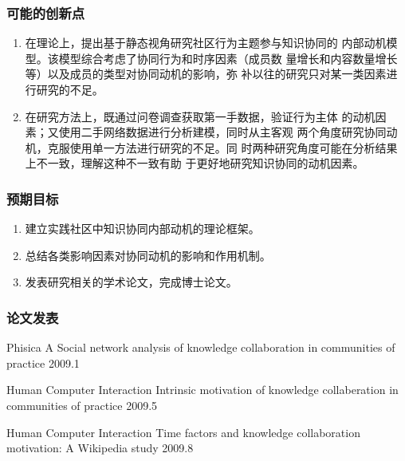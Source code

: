 \documentclass[slidestop,compress,mathserif,blue,compress]{beamer}
\begin{document}
\begin{frame}
  \frametitle{可能的创新点}
 \begin{enumerate}
\vfill
\item 在理论上，提出基于静态视角研究社区行为主题参与知识协同的
            内部动机模型。该模型综合考虑了协同行为和时序因素（成员数
            量增长和内容数量增长等）以及成员的类型对协同动机的影响，弥
            补以往的研究只对某一类因素进行研究的不足。
\item  在研究方法上，既通过问卷调查获取第一手数据，验证行为主体
              的动机因素；又使用二手网络数据进行分析建模，同时从主客观
              两个角度研究协同动机，克服使用单一方法进行研究的不足。同
              时两种研究角度可能在分析结果上不一致，理解这种不一致有助
             于更好地研究知识协同的动机因素。
\vfill
\end{enumerate}
\end{frame}

\begin{frame}
  \frametitle{预期目标}
\vfill
   \begin{enumerate}
\item 建立实践社区中知识协同内部动机的理论框架。
\item  总结各类影响因素对协同动机的影响和作用机制。
\item  发表研究相关的学术论文，完成博士论文。
\end{enumerate}  
\vfill
\end{frame}

\begin{frame}
  \frametitle{论文发表}

\vfill
  
\begin{block}{Phisica A}
Social network analysis of knowledge collaboration in 
communities of  practice  2009.1  
\end{block}

\begin{block}{Human Computer Interaction}
Intrinsic motivation of knowledge collaberation in 
communities of practice 2009.5
  
\end{block}

\begin{block}{Human Computer Interaction}
Time factors and knowledge collaboration motivation: 
A Wikipedia study  2009.8  
\end{block}
\vfill
\end{frame}
\end{document}
